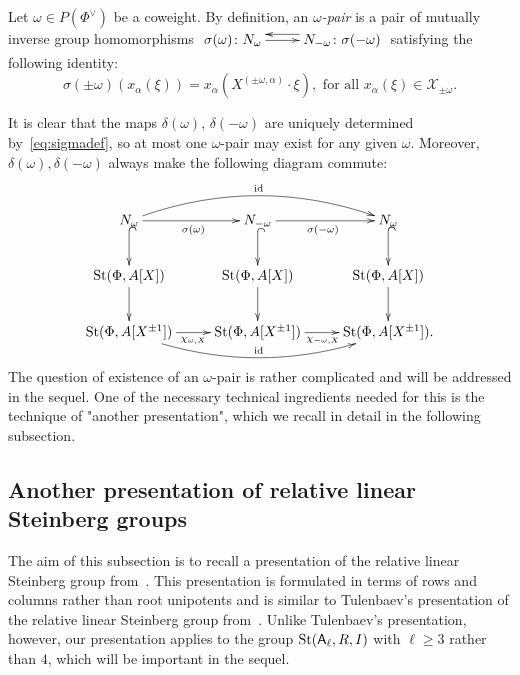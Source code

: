 \begin{dfn} \label{dfn:delta-pair}
Let $\omega \in P(\Phi^\vee)$ be a coweight.
By definition, an {\it $\omega$-pair} is a pair of mutually inverse group homomorphisms
$\xymatrix{ \sigma(\omega)\colon N_\omega \ar[r] & \ar@<-1.0ex>[l] N_{-\omega}\colon \sigma(-\omega) }$ satisfying the following identity:
\begin{equation} \label{eq:sigmadef}
\sigma(\pm \omega)(x_\alpha(\xi)) = x_\alpha(X^{(\pm \omega, \alpha)}\cdot \xi),
\text{ for all } x_\alpha(\xi) \in \mathcal{X}_{\pm\omega}.
\end{equation}\end{dfn}
It is clear that the maps $\delta(\omega)$, $\delta(-\omega)$ are uniquely determined by~\eqref{eq:sigmadef}, so at most one $\omega$-pair may exist for any given $\omega$.
Moreover, $\delta(\omega), \delta(-\omega)$ always make the following diagram commute:
\begin{equation} \label{eq:sigma-diagram}
\xymatrix{ N_\omega \ar[r]_{\sigma(\omega)}\ar@{^{(}->}[d] \ar@/^1.5pc/[rr]^{\mathrm{id}} & N_{-\omega} \ar@{^{(}->}[d] \ar[r]_{\sigma(-\omega)} & N_\omega \ar@{^{(}->}[d] \\
\St(\Phi, A[X]) \ar[d] & \St(\Phi, A[X]) \ar[d] & \St(\Phi, A[X]) \ar[d] \\
\St(\Phi, A[X^{\pm 1}]) \ar@<-0.0ex>[r]_{\chi_{\omega, X}} \ar@/_1.5pc/[rr]^{\mathrm{id}} & \St(\Phi, A[X^{\pm 1}]) \ar@<-0.0ex>[r]_{\chi_{-\omega, X}} & \St(\Phi, A[X^{\pm 1}]).} \end{equation}
The question of existence of an $\omega$-pair is rather complicated and will be addressed in the sequel.
One of the necessary technical ingredients needed for this is the technique of "another presentation", which we recall in detail in the following subsection.

\subsection{Another presentation of relative linear Steinberg groups}
The aim of this subsection is to recall a presentation of the relative linear Steinberg group from~\cite{LS17}.
This presentation is formulated in terms of rows and columns rather than root unipotents and is similar to
 Tulenbaev's presentation of the relative linear Steinberg group from~\cite[Definition~1.5]{Tu83}.
Unlike Tulenbaev's presentation, however, our presentation applies to the group $\operatorname{St}(\mathsf{A}_\ell, R, I)$ with $\ell \geq 3$ rather than $4$,
which will be important in the sequel.


